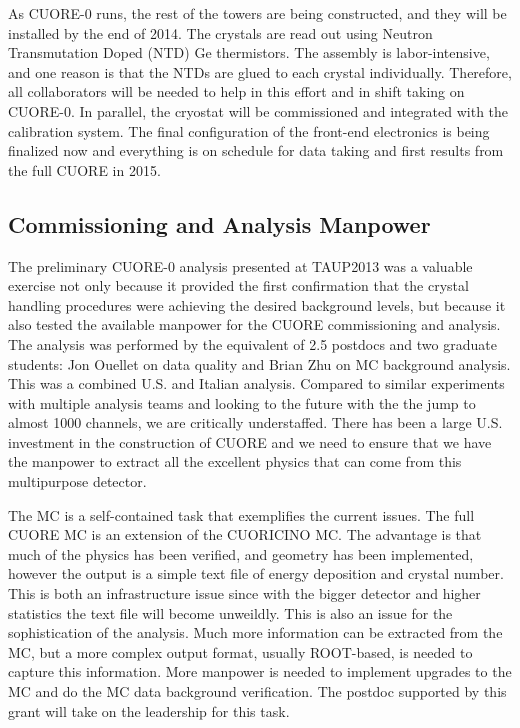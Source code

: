 As CUORE-0 runs, the rest of the towers are being constructed, and they will be installed by the end of 2014. The crystals are read out using Neutron Transmutation Doped (NTD) Ge thermistors. The assembly is labor-intensive, and one reason is that the NTDs are glued to each crystal individually. Therefore, all collaborators will be needed to help in this effort and in shift taking on CUORE-0. In parallel, the cryostat will be commissioned and integrated with the calibration system. The final configuration of the front-end electronics is being finalized now and everything is on schedule for data taking and first results from the full CUORE in 2015.

\subsection{Commissioning and Analysis Manpower}

The preliminary CUORE-0  analysis presented at TAUP2013 was a valuable exercise not only because it provided the first confirmation that the crystal handling procedures were achieving the desired background levels, but because it also tested the available manpower for the CUORE commissioning and analysis.  The analysis was performed by the equivalent of 2.5 postdocs and two graduate students: Jon Ouellet on data quality and Brian Zhu on MC background analysis. This was a combined U.S. and Italian analysis. Compared to similar experiments with multiple analysis teams and looking to the future with the the jump to almost 1000 channels, we are critically understaffed.  There has been a large U.S. investment in the construction of CUORE and we need to ensure that we have the manpower to extract all the excellent physics that can come from this multipurpose detector.

The MC is a self-contained task that exemplifies the current issues.  The full CUORE MC is an extension of the CUORICINO MC. The advantage is that much of the physics has been verified, and geometry has been implemented, however the output is a simple text file of energy deposition and crystal number. This is both an infrastructure issue since with the bigger detector and higher statistics the text file will become unweildly.  This is also an issue for the sophistication of the analysis. Much more information can be extracted from the MC, but a more complex output format, usually ROOT-based,  is needed to capture this information. More manpower is needed to implement upgrades to the MC and do the MC data background verification. The postdoc supported by this grant will take on the leadership for this task.

